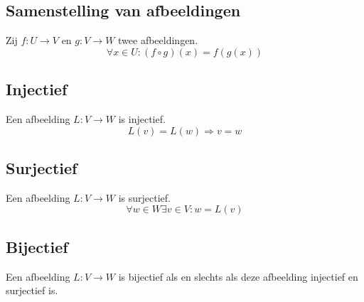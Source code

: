 \documentclass[lineaire_algebra_oplossingen.tex]{subfiles}
\begin{document}
\subsection{Samenstelling van afbeeldingen}
\label{samenstelling_van_afbeeldingen}
Zij $f: U \rightarrow V$ en $g: V\rightarrow W$ twee afbeeldingen.
\[
\forall x\in U: (f \circ g)(x) = f(g(x))
\]
\subsection{Injectief}
Een afbeelding $L: V \rightarrow W$ is injectief.
\[
L(v) = L(w) \Rightarrow v = w
\]
\subsection{Surjectief}
Een afbeelding $L: V \rightarrow W$ is surjectief.
\[
\forall w \in W \exists v \in V: w=L(v)
\]
\subsection{Bijectief}
Een afbeelding $L: V \rightarrow W$ is bijectief als en slechts als deze afbeelding injectief en surjectief is.
\end{document}
